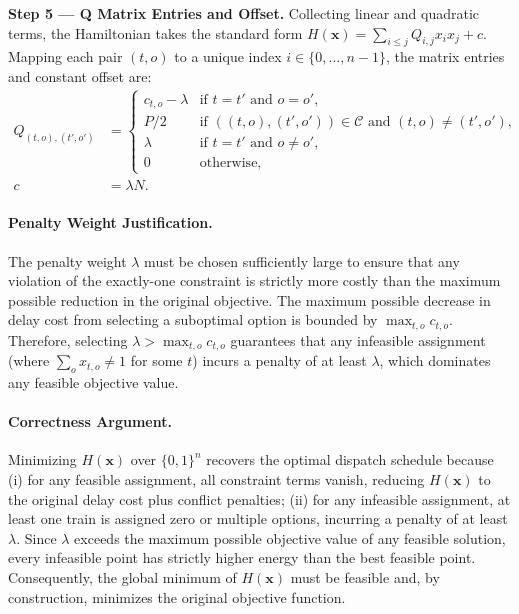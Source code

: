 \documentclass[12pt]{article}
\begin{document}
\textbf{Step 5 --- Q Matrix Entries and Offset.}
Collecting linear and quadratic terms, the Hamiltonian takes the standard form $H(\mathbf{x}) = \sum_{i \le j} Q_{i,j} x_i x_j + c$. Mapping each pair $(t,o)$ to a unique index $i \in \{0,\dots,n-1\}$, the matrix entries and constant offset are:
\begin{align}
Q_{(t,o),(t',o')} &= \begin{cases} 
c_{t,o} - \lambda & \text{if } t=t' \text{ and } o=o', \\
P/2 & \text{if } ((t,o),(t',o')) \in \mathcal{C} \text{ and } (t,o) \neq (t',o'), \\
\lambda & \text{if } t=t' \text{ and } o \neq o', \\
0 & \text{otherwise},
\end{cases} \\
c &= \lambda N.
\end{align}

\paragraph{Penalty Weight Justification.}
The penalty weight $\lambda$ must be chosen sufficiently large to ensure that any violation of the exactly-one constraint is strictly more costly than the maximum possible reduction in the original objective. The maximum possible decrease in delay cost from selecting a suboptimal option is bounded by $\max_{t,o} c_{t,o}$. Therefore, selecting $\lambda > \max_{t,o} c_{t,o}$ guarantees that any infeasible assignment (where $\sum_{o} x_{t,o} \neq 1$ for some $t$) incurs a penalty of at least $\lambda$, which dominates any feasible objective value.

\paragraph{Correctness Argument.}
Minimizing $H(\mathbf{x})$ over $\{0,1\}^n$ recovers the optimal dispatch schedule because (i) for any feasible assignment, all constraint terms vanish, reducing $H(\mathbf{x})$ to the original delay cost plus conflict penalties; (ii) for any infeasible assignment, at least one train is assigned zero or multiple options, incurring a penalty of at least $\lambda$. Since $\lambda$ exceeds the maximum possible objective value of any feasible solution, every infeasible point has strictly higher energy than the best feasible point. Consequently, the global minimum of $H(\mathbf{x})$ must be feasible and, by construction, minimizes the original objective function.
\end{document}
